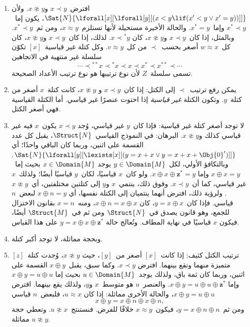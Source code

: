 \documentclass[../../../include/open-logic-section]{subfiles}
\begin{document}
\begin{enumerate}
  $x \approx y$ إذا وفقط إذا كان، لبعض~$n$ \emph{قياسي}، إما
  $x \oplus n = y$ وإما~$y \oplus n =x$. وبعبارة أخرى، يكون
  $x \approx y$ إذا وفقط إذا كانت المسافة بين~$x$ و$y$ منتهية. وإذا
  كان~$n$ و$m$ قياسيين، كان~$n \approx m$. وعرّف~\emph{كتلة}~$x$
  بأنها صنف التكافؤ~$[x] = \Setabs{y}{x \approx y}$.
\item افترض~$x \prec y$ و$x \not\approx y$. ولأن
  $\Sat{N}{\lforall[x][\lforall[y][(x < y \lif (x' < y \lor x' =
      y))]]}$، يكون إما~$x^* \prec y$ وإما~$x^* = y$. والحالة
  الأخيرة مستحيلة لأنها تستلزم~$x \approx y$، ومن ثم~$x^* \prec y$.
  وبالمثل، إذا كان~$x \prec y$ و$x \not\approx y$، كان
  $x \prec {^*y}$. لذلك، إذا كان~$x \prec y$ و$x \not\approx y$،
  كان كل~$w \approx x$ أصغر بحسب~$\prec$ من كل~$v \approx y$.
  وكل كتلة غير قياسية~$[x]$ تكوّن سلسلة غير منتهية في الاتجاهين
  \[
  \cdots \prec {^{**}x} \prec {^*}x \prec x \prec x^* \prec x^{**}
  \prec \cdots
  \]
  تسمى سلسلة~$Z$ لأن نوع ترتيبها هو نوع ترتيب الأعداد الصحيحة.
\item يمكن رفع ترتيب~$\prec$ إلى الكتل: إذا كان~$x \prec y$ و
  $x \not\approx y$، كانت كتلة~$x$ أصغر من كتلة~$y$. وتكون الكتلة
  \emph{غير قياسية} إذا احتوت عنصرًا غير قياسي. أما الكتلة القياسية
  فهي أصغر الكتل.
\item لا توجد أصغر كتلة غير قياسية: فإذا كان~$y$ غير قياسي، وُجد
  $x \prec y$ يكون~$x$ فيه غير قياسي كذلك و$x \not\approx y$.
  البرهان: في النموذج القياسي~$\Struct{N}$، يقبل كل عدد القسمة على
  اثنين، وربما كان الباقي واحدًا؛ أي
  $\Sat{N}{\lforall[y][\lexists[x][(y = x + x \lor y = x + x +
        \Obj{0}')]]}$. وبالتكافؤ الأولي، لكل~$y \in \Domain{M}$ يوجد
  $x \in \Domain{M}$ بحيث إما~$x \oplus x = y$ وإما
  $x \oplus x \oplus \mathbf{z}^*= y$. ولو كان~$x$ قياسيًا، لكان~$y$
  قياسيًا أيضًا؛ ولذلك~$x$ غير قياسي، كما أن~$x \prec y$. وفوق ذلك،
  ينتمي~$x$ و$y$ إلى كتلتين مختلفتين، أي~$x \not\approx y$. ولرؤية
  ذلك، افترض أنهما ينتميان إلى الكتلة نفسها، أي
  $x \oplus n = y$ لبعض~$n$ قياسي. فإذا كان~$y = x \oplus x$، كان
  $x \oplus n = x \oplus x$، ومنه~$x = n$ بقانون الاختزال للجمع،
  وهو قانون يصدق في~$\Struct{N}$ ومن ثم في~$\Struct{M}$ أيضًا، فيكون
  $x$ قياسيًا في نهاية المطاف. وتُعالج حالة
  $y = x \oplus x \oplus \mathbf{z}^*$ على هذا القياس.
\item وبحجة مماثلة، لا توجد أكبر كتلة.
\item ترتيب الكتل كثيف: إذا كانت~$[x]$ أصغر من~$[y]$، حيث
  $x \not\approx y$، وُجدت كتلة~$[z]$ متميزة منهما وتقع بينهما. افترض
  $x \prec y$. وكما سبق، يقبل~$x \oplus y$ القسمة على اثنين، وربما
  كان ثمة باق، ولذلك يوجد~$u \in \Domain{M}$ بحيث إما
  $x \oplus y = u \oplus u$ وإما
  $x \oplus y = u \oplus u \oplus \mathbf{z}^*$. والعنصر~$u$ هو
  متوسط~$x$ و$y$، ولذلك يقع بينهما. افترض
  $x \oplus y = u \oplus u$، والحالة الأخرى مماثلة: إذا كان
  $u \approx x$، فلبعض~$n$ قياسي
  \[
  x \oplus y = x \oplus n \oplus x \oplus n,
  \]
  ومن ثم~$y = x \oplus n \oplus n$، فيكون~$x \approx y$ خلافًا
  للفرض. فنستنتج~$u \not\approx x$. وتعطي حجة مماثلة
  $u \not\approx y$.
\end{enumerate}
\end{document}
